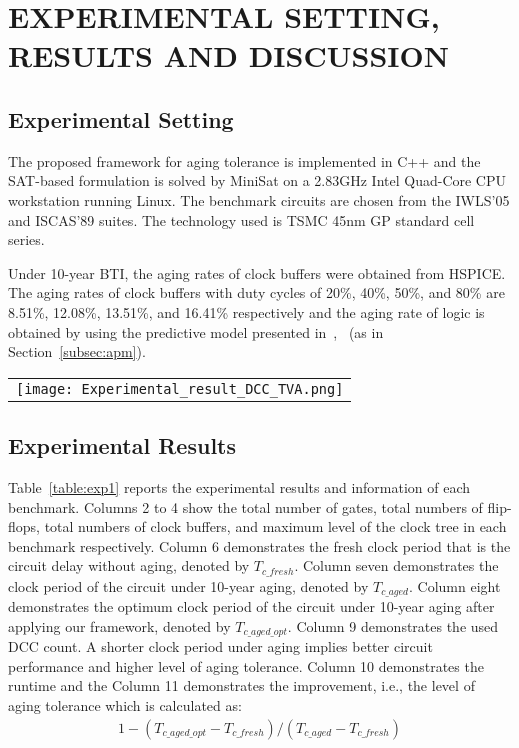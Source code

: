\section{EXPERIMENTAL SETTING, RESULTS AND DISCUSSION}
\label{sec:exp}
\subsection{Experimental Setting}
The proposed framework for aging tolerance is implemented in C++ and the SAT-based formulation is solved by MiniSat on a 2.83GHz Intel Quad-Core CPU workstation running Linux. The benchmark circuits are chosen from the IWLS'05 and ISCAS'89 suites. The technology used is TSMC 45nm GP standard cell series.

Under 10-year BTI, the aging rates of clock buffers were obtained from HSPICE. The aging rates of clock buffers with duty cycles of 20\%, 40\%, 50\%, and 80\% are 8.51\%, 12.08\%, 13.51\%, and 16.41\% respectively and the aging rate of logic is obtained by using the predictive model presented in~\cite{wang2010impact},~\cite{wang2007efficient} (as in Section~\ref{subsec:apm}).

\begin{table*}
\centering
\caption{Results of aging tolerance}
	\begin{tabular}{l}
	\texttt{[image: Experimental\_result\_DCC\_TVA.png]}
	\end{tabular}
\label{table:exp1}
\end{table*}

\subsection{Experimental Results}
Table~\ref{table:exp1} reports the experimental results and information of each benchmark. Columns 2 to 4 show the total number of gates, total numbers of flip-flops, total numbers of clock buffers, and maximum level of the clock tree in each benchmark respectively. Column 6 demonstrates the fresh clock period that is the circuit delay without aging, denoted by $T_{c\_fresh}$. Column seven demonstrates the clock period of the circuit under 10-year aging, denoted by $T_{c\_aged}$. Column eight demonstrates the optimum clock period of the circuit under 10-year aging after applying our framework, denoted by $T_{c\_aged\_opt}$. Column 9 demonstrates the used DCC count. A shorter clock period under aging implies better circuit performance and higher level of aging tolerance. Column 10 demonstrates the runtime and the Column 11 demonstrates the improvement, i.e., the level of aging tolerance which is calculated as:
\begin{gather*}
1 - (T_{c\_aged\_opt} - T_{c\_fresh}) / (T_{c\_aged} - T_{c\_fresh})
\end{gather*}

